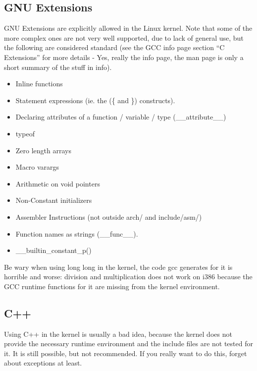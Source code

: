 \documentclass[a4paper,8pt,english]{sphinxmanual}
\begin{document}
\subsection{GNU Extensions}
\label{kernel-hacking/hacking:gnu-extensions}
GNU Extensions are explicitly allowed in the Linux kernel. Note that
some of the more complex ones are not very well supported, due to lack
of general use, but the following are considered standard (see the GCC
info page section ``C Extensions'' for more details - Yes, really the info
page, the man page is only a short summary of the stuff in info).
\begin{itemize}
\item {} 
Inline functions

\item {} 
Statement expressions (ie. the (\{ and \}) constructs).

\item {} 
Declaring attributes of a function / variable / type
(\_\_attribute\_\_)

\item {} 
typeof

\item {} 
Zero length arrays

\item {} 
Macro varargs

\item {} 
Arithmetic on void pointers

\item {} 
Non-Constant initializers

\item {} 
Assembler Instructions (not outside arch/ and include/asm/)

\item {} 
Function names as strings (\_\_func\_\_).

\item {} 
\_\_builtin\_constant\_p()

\end{itemize}

Be wary when using long long in the kernel, the code gcc generates for
it is horrible and worse: division and multiplication does not work on
i386 because the GCC runtime functions for it are missing from the
kernel environment.


\subsection{C++}
\label{kernel-hacking/hacking:c}
Using C++ in the kernel is usually a bad idea, because the kernel does
not provide the necessary runtime environment and the include files are
not tested for it. It is still possible, but not recommended. If you
really want to do this, forget about exceptions at least.
\end{document}
